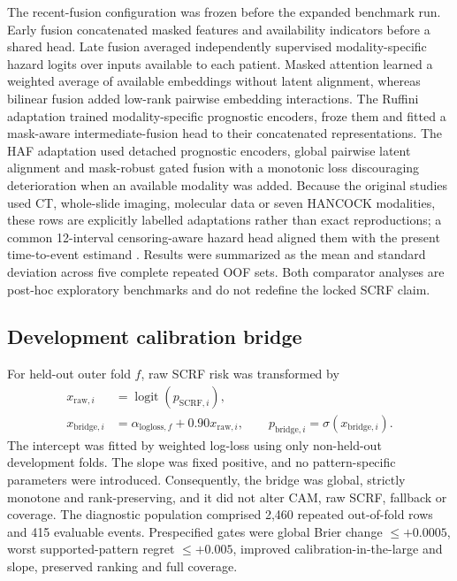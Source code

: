 \documentclass[pdflatex,sn-nature]{sn-jnl}
\begin{document}
The recent-fusion configuration was frozen before the expanded benchmark run. Early fusion concatenated masked features and availability indicators before a shared head. Late fusion averaged independently supervised modality-specific hazard logits over inputs available to each patient. Masked attention learned a weighted average of available embeddings without latent alignment, whereas bilinear fusion added low-rank pairwise embedding interactions. The Ruffini adaptation trained modality-specific prognostic encoders, froze them and fitted a mask-aware intermediate-fusion head to their concatenated representations. The HAF adaptation used detached prognostic encoders, global pairwise latent alignment and mask-robust gated fusion with a monotonic loss discouraging deterioration when an available modality was added. Because the original studies used CT, whole-slide imaging, molecular data or seven HANCOCK modalities, these rows are explicitly labelled adaptations rather than exact reproductions; a common 12-interval censoring-aware hazard head aligned them with the present time-to-event estimand \cite{gensheimer2019}. Results were summarized as the mean and standard deviation across five complete repeated OOF sets. Both comparator analyses are post-hoc exploratory benchmarks and do not redefine the locked SCRF claim.

\subsection{Development calibration bridge}
For held-out outer fold $f$, raw SCRF risk was transformed by
\begin{align}
x_{\mathrm{raw},i}&=\operatorname{logit}(p_{\mathrm{SCRF},i}),\\
x_{\mathrm{bridge},i}&=\alpha_{\mathrm{logloss},f}+0.90x_{\mathrm{raw},i},\qquad
p_{\mathrm{bridge},i}=\sigma(x_{\mathrm{bridge},i}).
\end{align}
The intercept was fitted by weighted log-loss using only non-held-out development folds. The slope was fixed positive, and no pattern-specific parameters were introduced. Consequently, the bridge was global, strictly monotone and rank-preserving, and it did not alter CAM, raw SCRF, fallback or coverage. The diagnostic population comprised 2,460 repeated out-of-fold rows and 415 evaluable events. Prespecified gates were global Brier change $\le +0.0005$, worst supported-pattern regret $\le +0.005$, improved calibration-in-the-large and slope, preserved ranking and full coverage.
\end{document}
